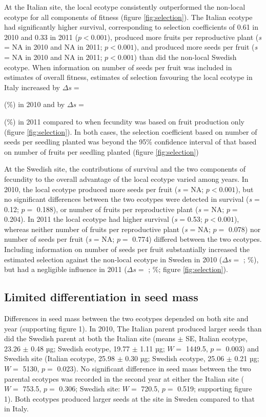 \documentclass[]{article}
\begin{document}
At the Italian site, the local ecotype consistently outperformed the non-local ecotype for all components of fitness (figure \ref{fig:selection}).
The Italian ecotype had significantly higher survival, corresponding to selection coefficients of
0.61 in 2010 and
0.33 in 2011
(\(p < 0.001\)),
produced more fruits per reproductive plant
(\emph{s} =
NA in 2010 and
NA in 2011;
\(p < 0.001\)),
and produced more seeds per fruit
(\emph{s} =
NA in 2010 and
NA in 2011;
\(p < 0.001\))
than did the non-local Swedish ecotype.
When information on number of seeds per fruit was included in estimates of overall fitness, estimates of selection favouring the local ecotype in Italy increased by
\(\Delta s=\)

(\%)
in 2010 and by \(\Delta s=\)

(\%)
in 2011 compared to when fecundity was based on fruit production only (figure \ref{fig:selection}).
In both cases, the selection coefficient based on number of seeds per seedling planted was beyond the 95\% confidence interval of that based on number of fruits per seedling planted (figure \ref{fig:selection})

At the Swedish site, the contributions of survival and the two components of fecundity to the overall advantage of the local ecotype varied among years.
In 2010, the local ecotype produced more seeds per fruit
(\emph{s} = NA;
\(p < 0.001\)),
but no significant differences between the two ecotypes were detected in survival
(\emph{s} = 0.12;
\(p=\) 0.188),
or number of fruits per reproductive plant
(\emph{s} = NA;
\(p=\) 0.204).
In 2011 the local ecotype had higher survival
(\emph{s} = 0.53;
\(p < 0.001\)),
whereas neither number of fruits per reproductive plant
(\emph{s} = NA;
\(p=\) 0.078)
nor number of seeds per fruit
(\emph{s} = NA;
\(p=\) 0.774)
differed between the two ecotypes.
Including information on number of seeds per fruit substantially increased the estimated selection against the non-local ecotype in Sweden in 2010
(\(\Delta s=\)
;
\%),
but had a negligible influence in 2011
(\(\Delta s=\)
;
\%;
figure \ref{fig:selection}).

\hypertarget{limited-differentiation-in-seed-mass}{%
\subsection{Limited differentiation in seed mass}\label{limited-differentiation-in-seed-mass}}

Differences in seed mass between the two ecotypes depended on both site and year (supporting figure 1).
In 2010, The Italian parent produced larger seeds than did the Swedish parent at both the Italian site
(means \(\pm\) SE, Italian ecotype,
23.26
\(\pm\)
0.48
µg; Swedish ecotype,
19.77
\(\pm\)
1.11
µg;
\(W =\) 1449.5,
\(p=\) 0.003)
and Swedish site
(Italian ecotype,
25.98
\(\pm\)
0.30
µg; Swedish ecotype,
25.06
\(\pm\)
0.21
µg;
\(W =\) 5130,
\(p=\) 0.023).
No significant difference in seed mass between the two parental ecotypes was recorded in the second year at either the Italian site
(
\(W =\) 753.5, \(p=\) 0.306;
Swedish site:
\(W =\) 720.5, \(p=\) 0.519;
supporting figure 1).
Both ecotypes produced larger seeds at the site in Sweden compared to that in Italy.
\end{document}

